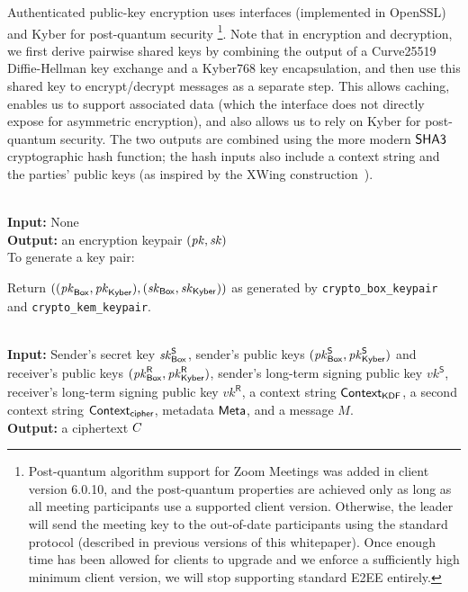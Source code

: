 Authenticated public-key encryption uses \sodium{} interfaces (implemented in OpenSSL) and Kyber for post-quantum security%
%
\footnote{Post-quantum algorithm support for Zoom Meetings was added in client version 6.0.10, and the post-quantum properties are achieved only as long as all meeting participants use a supported client version. Otherwise, the leader will send the meeting key to the out-of-date participants using the standard protocol (described in previous versions of this whitepaper). Once enough time has been allowed for clients to upgrade and we enforce a sufficiently high minimum client version, we will stop supporting standard E2EE entirely.}.
%
Note that in encryption and decryption, we first
derive pairwise shared keys by combining the output of a Curve25519 Diffie-Hellman key exchange and a Kyber768 key encapsulation, and then use this shared key to encrypt/decrypt messages as a separate step. This allows caching, enables us to support associated data (which the \sodium{} interface does not directly expose for asymmetric encryption), and also allows us to rely on Kyber for post-quantum security. The two outputs are combined using the more modern ${\sf SHA3}$ cryptographic hash function; the hash inputs also include a context string and the parties' public keys (as inspired by the XWing construction~\cite{xwing}).


{\underline {\bf \cboxkeygen}}\\
{\bf Input:} None \\
{\bf Output:} an encryption keypair $(\mathit{pk},\mathit{sk})$ \\

To generate a key pair:

\vspace{-1.5em}
\begingroup
\RaggedRight
\begin{enumerate*}
\item Return $((\mathit{pk}_{{\sf Box}}, \mathit{pk}_{{\sf Kyber}}), (\mathit{sk}_{{\sf Box}},  \mathit{sk}_{{\sf Kyber}}))$ as generated by \texttt{crypto\_box\_keypair} and \texttt{crypto\_kem\_keypair}.
\end{enumerate*}
\endgroup


{\underline {\bf \cboxencrypt}} \\
{\bf Input:} Sender's secret key $\mathit{sk}_{{\sf Box}}^{\sf S}$, sender's public keys $(\mathit{pk}_{{\sf Box}}^{\sf S}, \mathit{pk}_{{\sf Kyber}}^{\sf S})$ and receiver's public keys $(\mathit{pk}_{{\sf Box}}^{\sf R}, \mathit{pk}_{{\sf Kyber}}^{\sf R})$, sender's long-term signing public key $vk^\textsf{S}$, receiver's long-term signing public key $vk^\textsf{R}$, a context string
${\sf Context}_\textsf{KDF}$, a second context string ${\sf Context}_\textsf{cipher}$, metadata ${\sf Meta}$,
and a message $M$. \\
{\bf Output:} a ciphertext $C$ \\

